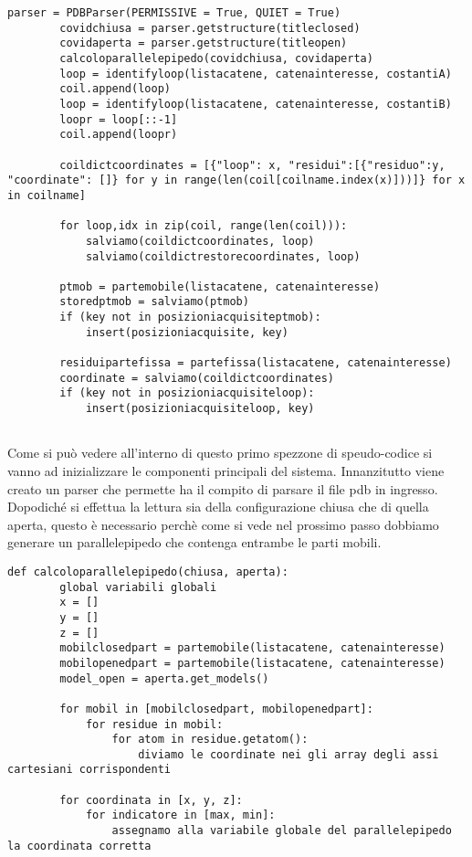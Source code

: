 \begin{minipage}{\textwidth}
	\begin{lstlisting}[caption={Fase d'inizializzazione del framework}]
		parser = PDBParser(PERMISSIVE = True, QUIET = True)
		covidchiusa = parser.getstructure(titleclosed)
		covidaperta = parser.getstructure(titleopen)
		calcoloparallelepipedo(covidchiusa, covidaperta)
		loop = identifyloop(listacatene, catenainteresse, costantiA)
		coil.append(loop)
		loop = identifyloop(listacatene, catenainteresse, costantiB)
		loopr = loop[::-1]
		coil.append(loopr)
		
		coildictcoordinates = [{"loop": x, "residui":[{"residuo":y, "coordinate": []} for y in range(len(coil[coilname.index(x)]))]} for x in coilname]
		
		for loop,idx in zip(coil, range(len(coil))):
			salviamo(coildictcoordinates, loop)
			salviamo(coildictrestorecoordinates, loop)
		
		ptmob = partemobile(listacatene, catenainteresse)
		storedptmob = salviamo(ptmob)
		if (key not in posizioniacquisiteptmob):
			insert(posizioniacquisite, key)
		
		residuipartefissa = partefissa(listacatene, catenainteresse)
		coordinate = salviamo(coildictcoordinates)
		if (key not in posizioniacquisiteloop):
			insert(posizioniacquisiteloop, key)
	
	\end{lstlisting}
\end{minipage}
Come si può vedere all'interno di questo primo spezzone di speudo-codice si vanno ad inizializzare le componenti principali del sistema. Innanzitutto viene creato un parser che permette ha il compito di parsare il file pdb in ingresso. Dopodiché si effettua la lettura sia della configurazione chiusa che di quella aperta, questo è necessario perchè come si vede nel prossimo passo dobbiamo generare un parallelepipedo che contenga entrambe le parti mobili. 

\begin{minipage}{\textwidth}
	\begin{lstlisting}[caption={Calcolo del parallelepipedo}]
		def calcoloparallelepipedo(chiusa, aperta):
		global variabili globali
		x = []
		y = []
		z = []
		mobilclosedpart = partemobile(listacatene, catenainteresse)
		mobilopenedpart = partemobile(listacatene, catenainteresse)
		model_open = aperta.get_models()
		
		for mobil in [mobilclosedpart, mobilopenedpart]:
			for residue in mobil:
				for atom in residue.getatom():
					diviamo le coordinate nei gli array degli assi cartesiani corrispondenti
		
		for coordinata in [x, y, z]:
			for indicatore in [max, min]:
				assegnamo alla variabile globale del parallelepipedo la coordinata corretta

	\end{lstlisting}
\end{minipage}

